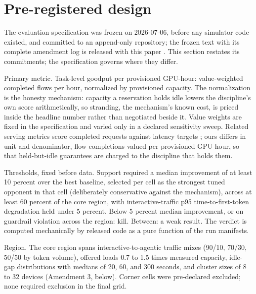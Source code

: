 \section{Pre-registered design}

The evaluation specification was frozen on 2026-07-06, before any simulator
code existed, and committed to an append-only repository; the frozen text
with its complete amendment log is released with this paper \citep{evalspec2026}.
This section restates its commitments; the specification governs where they
differ.

Primary metric. Task-level goodput per provisioned GPU-hour: value-weighted
completed flows per hour, normalized by provisioned capacity. The
normalization is the honesty mechanism: capacity a reservation holds idle
lowers the discipline's own score arithmetically, so stranding, the
mechanism's known cost, is priced inside the headline number rather than
negotiated beside it. Value weights are fixed in the specification and
varied only in a declared sensitivity sweep. Related serving metrics score
completed requests against latency targets \citep{mars2026}; ours differs in unit
and denominator, flow completions valued per provisioned GPU-hour, so that
held-but-idle guarantees are charged to the discipline that holds them.

Thresholds, fixed before data. Support required a median improvement of at
least 10 percent over the best baseline, selected per cell as the strongest
tuned opponent in that cell (deliberately conservative against the
mechanism), across at least 60 percent of the core region, with
interactive-traffic p95 time-to-first-token degradation held under 5
percent. Below 5 percent median improvement, or on guardrail violation
across the region: kill. Between: a weak result. The verdict is computed
mechanically by released code as a pure function of the run manifests.

Region. The core region spans interactive-to-agentic traffic mixes (90/10,
70/30, 50/50 by token volume), offered loads 0.7 to 1.5 times measured
capacity, idle-gap distributions with medians of 20, 60, and 300 seconds,
and cluster sizes of 8 to 32 devices (Amendment 3, below). Corner cells
were pre-declared excluded; none required exclusion in the final grid.

